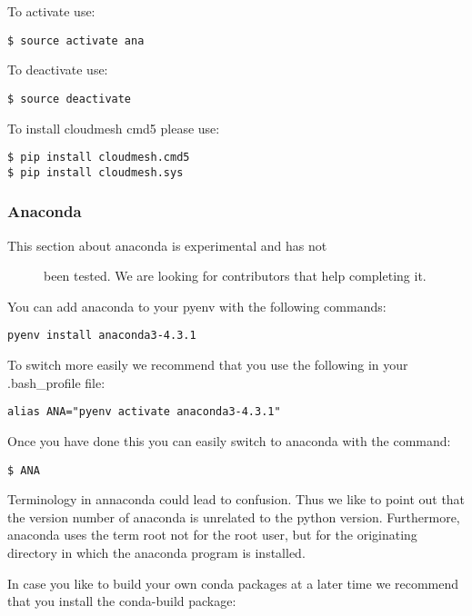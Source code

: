 To activate use:

\begin{verbatim}
$ source activate ana
\end{verbatim}

To deactivate use:

\begin{verbatim}
$ source deactivate
\end{verbatim}

To install cloudmesh cmd5 please use:

\begin{verbatim}
$ pip install cloudmesh.cmd5
$ pip install cloudmesh.sys
\end{verbatim}

\subsubsection{Anaconda}\label{anaconda}

\begin{description}
\item[This section about anaconda is experimental and has not]
been tested. We are looking for contributors that help completing it.
\end{description}

You can add anaconda to your pyenv with the following commands:

\begin{verbatim}
pyenv install anaconda3-4.3.1
\end{verbatim}

To switch more easily we recommend that you use the following in your
.bash\_profile file:

\begin{verbatim}
alias ANA="pyenv activate anaconda3-4.3.1"
\end{verbatim}

Once you have done this you can easily switch to anaconda with the
command:

\begin{verbatim}
$ ANA
\end{verbatim}

Terminology in annaconda could lead to confusion. Thus we like to point
out that the version number of anaconda is unrelated to the python
version. Furthermore, anaconda uses the term root not for the root user,
but for the originating directory in which the anaconda program is
installed.

In case you like to build your own conda packages at a later time we
recommend that you install the conda-build package:

